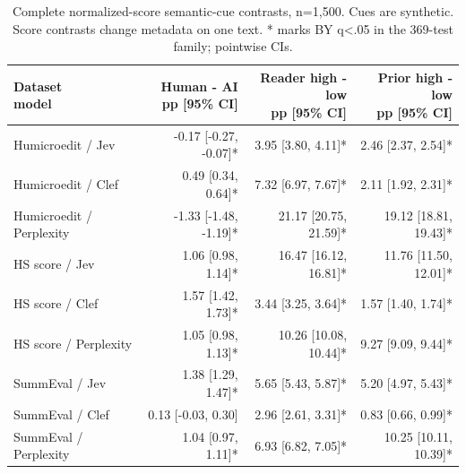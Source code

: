 \begin{table}[t]
\centering\footnotesize
\setlength{\tabcolsep}{3.5pt}
\begin{tabular}{@{}lrrr@{}}
\toprule
\shortstack[l]{Dataset\\{}model} & \shortstack[l]{Human - AI\\{}pp [95\% CI]} & \shortstack[l]{Reader high - low\\{}pp [95\% CI]} & \shortstack[l]{Prior high - low\\{}pp [95\% CI]} \\
\midrule
Humicroedit / Jev & -0.17 [-0.27, -0.07]* & 3.95 [3.80, 4.11]* & 2.46 [2.37, 2.54]* \\
Humicroedit / Clef & 0.49 [0.34, 0.64]* & 7.32 [6.97, 7.67]* & 2.11 [1.92, 2.31]* \\
Humicroedit / Perplexity & -1.33 [-1.48, -1.19]* & 21.17 [20.75, 21.59]* & 19.12 [18.81, 19.43]* \\
HS score / Jev & 1.06 [0.98, 1.14]* & 16.47 [16.12, 16.81]* & 11.76 [11.50, 12.01]* \\
HS score / Clef & 1.57 [1.42, 1.73]* & 3.44 [3.25, 3.64]* & 1.57 [1.40, 1.74]* \\
HS score / Perplexity & 1.05 [0.98, 1.13]* & 10.26 [10.08, 10.44]* & 9.27 [9.09, 9.44]* \\
SummEval / Jev & 1.38 [1.29, 1.47]* & 5.65 [5.43, 5.87]* & 5.20 [4.97, 5.43]* \\
SummEval / Clef & 0.13 [-0.03, 0.30] & 2.96 [2.61, 3.31]* & 0.83 [0.66, 0.99]* \\
SummEval / Perplexity & 1.04 [0.97, 1.11]* & 6.93 [6.82, 7.05]* & 10.25 [10.11, 10.39]* \\
\bottomrule
\end{tabular}
\caption{Complete normalized-score semantic-cue contrasts, n=1,500. Cues are synthetic. Score contrasts change metadata on one text. * marks BY q<.05 in the 369-test family; pointwise CIs.}
\label{tab:appendix_score_semantic}
\end{table}
